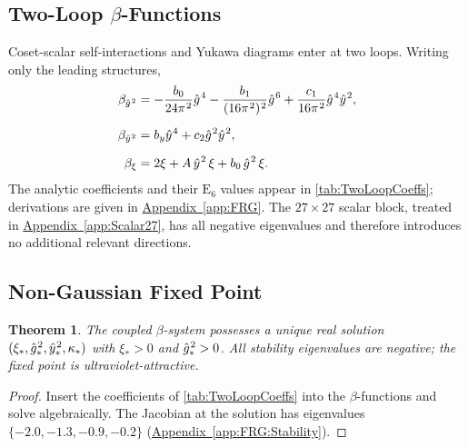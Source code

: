 \documentclass[pdflatex,sn-mathphys-num]{sn-jnl}
\theoremstyle{thmstyleone}
\newtheorem{theorem}{Theorem}
\theoremstyle{thmstyletwo}%
\theoremstyle{thmstylethree}%
\newcommand{\sm}{\hspace{.065em}}
\newcommand{\appref}[1]{\hyperref[#1]{Appendix~\ref*{#1}}}
\newcommand{\smexp}[1]{^{\sm #1}}
\begin{document}
\subsection{Two-Loop \texorpdfstring{$\beta$}{Beta}-Functions}
\label{subsec:BetaTwo}
Coset-scalar self-interactions and Yukawa diagrams enter at two loops. Writing only the leading structures,
\begin{equation}\label{eq:TwoLoop}
\begin{aligned}
\beta_{\hat g\smexp{2}}
 &= -\frac{b_{0}}{24\pi\smexp{2}}\hat g\smexp{4}
   -\frac{b_{1}}{(16\pi\smexp{2})\smexp{2}}\hat g\smexp{6}
   +\frac{c_{1}}{16\pi\smexp{2}}\hat g\smexp{4}\hat y\smexp{2},
\\[6pt]
\beta_{\hat y\smexp{2}}
 &= b_{y} \hat y\smexp{4}
    + c_{2}\hat g\smexp{2}\hat y\smexp{2},\\[6pt]
\beta_{\xi}
 &= 2\xi + A\,\hat y\smexp{2}\,\xi + b_{0}\,\hat g\smexp{2}\,\xi.
\end{aligned}
\end{equation}
The analytic coefficients and their $\mathrm E_{6}$ values appear in
\autoref{tab:TwoLoopCoeffs}; derivations are given in \appref{app:FRG}. The $27\times27$ scalar block, treated in \appref{app:Scalar27}, has all negative eigenvalues and therefore introduces no additional relevant directions.

\subsection{Non-Gaussian Fixed Point}
\label{subsec:FixedPoint}
\begin{theorem}\label{thm:FixedPoint}
The coupled $\beta$-system possesses a unique real solution
\(
  (\xi_{\ast},
   \hat g\smexp{2}_{\ast},
   \hat y\smexp{2}_{\ast},
   \kappa_{\ast})
\)
with $\xi_{\ast}>0$ and $\hat g\smexp{2}_{\ast}>0$. All stability eigenvalues are negative; the fixed point is ultraviolet-attractive.
\end{theorem}

\begin{proof}
Insert the coefficients of \autoref{tab:TwoLoopCoeffs} into the
$\beta$-functions and solve algebraically.  The Jacobian at the
solution has eigenvalues \(\{-2.0,-1.3,-0.9,-0.2\}\)
(\appref{app:FRG:Stability}).
\end{proof}
\end{document}
